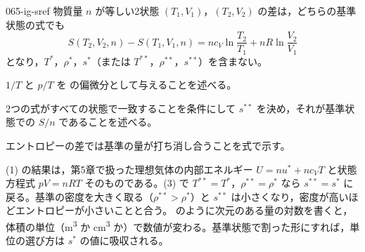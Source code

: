 \documentclass[uplatex,dvipdfmx,a4paper,11pt]{jsarticle}
\begin{document}
\begin{kaisetsu}{065-ig-sref}
物質量 $n$ が等しい2状態 $(T_{1},V_{1})$，$(T_{2},V_{2})$ の差は，どちらの基準状態の式でも
\[ S(T_{2},V_{2},n) - S(T_{1},V_{1},n) = nc_{V}\ln\frac{T_{2}}{T_{1}} + nR\ln\frac{V_{2}}{V_{1}} \]
となり，$T^{*}$，$\rho^{*}$，$s^{*}$（または $T^{**}$，$\rho^{**}$，$s^{**}$）を含まない。
\begin{ronten}
  \item {} $1/T$ と $p/T$ を  の偏微分として与えることを述べる。
  \item {} 2つの式がすべての状態で一致することを条件にして $s^{**}$ を決め，それが基準状態での $S/n$ であることを述べる。
  \item {} エントロピーの差では基準の量が打ち消し合うことを式で示す。
\end{ronten}
\kenzan (1) の結果は，第5章で扱った理想気体の内部エネルギー $U = nu^{*} + nc_{V}T$ と状態方程式 $pV = nRT$ そのものである。(3) で $T^{**} = T^{*}$，$\rho^{**} = \rho^{*}$ なら $s^{**} = s^{*}$ に戻る。基準の密度を大きく取る（$\rho^{**} > \rho^{*}$）と $s^{**}$ は小さくなり，密度が高いほどエントロピーが小さいことと合う。
\tsumazuki {} のように次元のある量の対数を書くと，体積の単位（\unit{\metre\cubed} か \unit{\centi\metre\cubed} か）で数値が変わる。基準状態で割った形にすれば，単位の選び方は $s^{*}$ の値に吸収される。
\end{kaisetsu}
\end{document}
